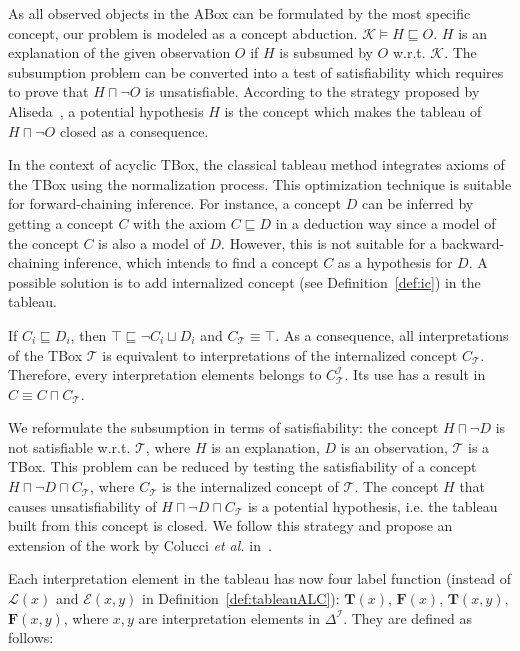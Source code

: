 \documentclass{article}
\begin{document}
As all observed objects in the ABox can be formulated by the most specific concept, our problem is modeled as a concept abduction.
$\mathcal{K}\vDash H\sqsubseteq O$.  $H$ is an explanation of the given observation $O$ if $H$ is subsumed by $O$ w.r.t.  $\mathcal{K}$. 
The subsumption problem can be converted into a test of satisfiability which requires to prove that $H\sqcap \neg O$ is unsatisfiable.
According to the strategy proposed by Aliseda~\cite{aliseda1997seeking}, a potential hypothesis $H$ is the concept which makes the tableau of  $H\sqcap \neg O$ closed as a consequence.

In the context of acyclic TBox, the classical tableau method integrates axioms of the TBox using the normalization process. This optimization technique is suitable for forward-chaining inference.
For instance, a concept $D$ can be inferred by getting a concept $C$ with the axiom $C\sqsubseteq D$ in a deduction way since a model of the concept $C$ is also a model of $D$.
However, this is not suitable for a backward-chaining inference, which intends to find a concept $C$ as a hypothesis for $D$. A possible solution is to add
internalized concept (see Definition~\ref{def:ic}) in the tableau.

If $C_i \sqsubseteq D_i$, then $\top \sqsubseteq \neg C_i  \sqcup D_i$ and  $C_\mathcal{T}\equiv \top$. 
As a consequence, all interpretations of the TBox $\mathcal{T}$ is equivalent to interpretations of the internalized concept $C_\mathcal{T}$.
Therefore, every interpretation elements belongs to  $C_\mathcal{T}^\mathcal{I}$. 
Its use has a result in $C\equiv C\sqcap C_\mathcal{T}$.


We reformulate the subsumption in terms of satisfiability: the concept $H \sqcap \neg D$ is not satisfiable w.r.t. $\mathcal{T}$, where $H$ is an explanation, $D$ is an observation,
$\mathcal{T}$ is a TBox. This problem can be reduced by testing the satisfiability of a concept $ H\sqcap \neg D \sqcap C_\mathcal{T}$, where $ C_\mathcal{T}$ is the internalized concept of $\mathcal{T}$.
The concept $H$ that causes unsatisfiability of $H\sqcap\neg D\sqcap C_\mathcal{T}$ is a potential hypothesis, i.e. the tableau built from this concept is closed.
We follow this strategy and propose an extension of the work by Colucci \textit{et al.} in~\cite{colucci2004uniform}.

Each interpretation element in the tableau has now four label function (instead of $\mathcal{L}(x)$ and $\mathcal{E}(x,y)$ in Definition~\ref{def:tableauALC}):
$\mathbf{T}(x)$, $\mathbf{F}(x)$, $\mathbf{T}(x,y)$, $\mathbf{F}(x,y)$,
where  $x,y$ are interpretation elements in $\Delta^\mathcal{I}$.
They are defined as follows:
\end{document}

